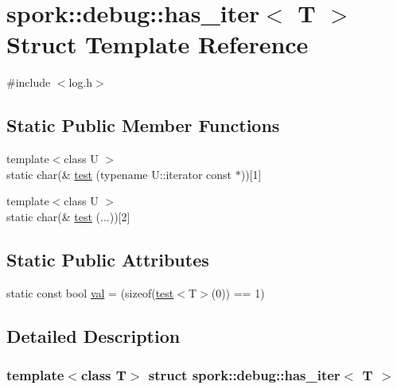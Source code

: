 \hypertarget{structspork_1_1debug_1_1has__iter}{}\section{spork\+:\+:debug\+:\+:has\+\_\+iter$<$ T $>$ Struct Template Reference}
\label{structspork_1_1debug_1_1has__iter}


{\ttfamily \#include $<$log.\+h$>$}

\subsection*{Static Public Member Functions}
\begin{DoxyCompactItemize}
\item 
{\footnotesize template$<$class U $>$ }\\static char(\& \hyperlink{structspork_1_1debug_1_1has__iter_a456c43f8ffe6dc2c0e43646ee103573b}{test} (typename U\+::iterator const $\ast$))\mbox{[}1\mbox{]}
\item 
{\footnotesize template$<$class U $>$ }\\static char(\& \hyperlink{structspork_1_1debug_1_1has__iter_a646fcb18bda345c03c9f8d340591301b}{test} (...))\mbox{[}2\mbox{]}
\end{DoxyCompactItemize}
\subsection*{Static Public Attributes}
\begin{DoxyCompactItemize}
\item 
static const bool \hyperlink{structspork_1_1debug_1_1has__iter_a895266ecb40a2fbf23b47f4a78b0cd39}{val} = (sizeof(\hyperlink{structspork_1_1debug_1_1has__iter_a456c43f8ffe6dc2c0e43646ee103573b}{test}$<$T$>$(0)) == 1)
\end{DoxyCompactItemize}


\subsection{Detailed Description}
\subsubsection*{template$<$class T$>$\newline
struct spork\+::debug\+::has\+\_\+iter$<$ T $>$}



